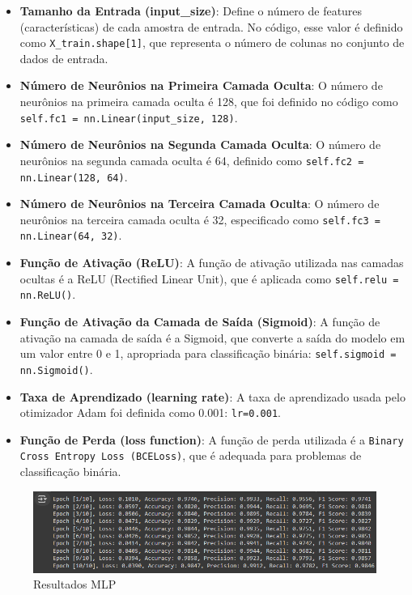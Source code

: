 \documentclass[conference]{IEEEtran}
\begin{document}
\begin{itemize}
    \item \textbf{Tamanho da Entrada (input\_size)}: Define o número de features (características) de cada amostra de entrada. No código, esse valor é definido como \texttt{X\_train.shape[1]}, que representa o número de colunas no conjunto de dados de entrada.
    
    \item \textbf{Número de Neurônios na Primeira Camada Oculta}: O número de neurônios na primeira camada oculta é 128, que foi definido no código como \texttt{self.fc1 = nn.Linear(input\_size, 128)}.
    
    \item \textbf{Número de Neurônios na Segunda Camada Oculta}: O número de neurônios na segunda camada oculta é 64, definido como \texttt{self.fc2 = nn.Linear(128, 64)}.
    
    \item \textbf{Número de Neurônios na Terceira Camada Oculta}: O número de neurônios na terceira camada oculta é 32, especificado como \texttt{self.fc3 = nn.Linear(64, 32)}.
    
    \item \textbf{Função de Ativação (ReLU)}: A função de ativação utilizada nas camadas ocultas é a ReLU (Rectified Linear Unit), que é aplicada como \texttt{self.relu = nn.ReLU()}.
    
    \item \textbf{Função de Ativação da Camada de Saída (Sigmoid)}: A função de ativação na camada de saída é a Sigmoid, que converte a saída do modelo em um valor entre 0 e 1, apropriada para classificação binária: \texttt{self.sigmoid = nn.Sigmoid()}.
    
    \item \textbf{Taxa de Aprendizado (learning rate)}: A taxa de aprendizado usada pelo otimizador Adam foi definida como 0.001: \texttt{lr=0.001}.
    
    \item \textbf{Função de Perda (loss function)}: A função de perda utilizada é a \texttt{Binary Cross Entropy Loss (BCELoss)}, que é adequada para problemas de classificação binária.
\end{itemize}

\begin{figure}[h!]
    \centering
    \includegraphics[width=\linewidth]{mlp-results.png}
    \caption{Resultados MLP}
    \label{fig:result-mlp}
\end{figure}
\end{document}
